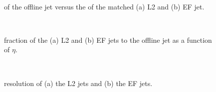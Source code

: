 \begin{figure}
\centering
\mbox{
                              }
\caption[Offline jet \et{} versus L2/EF jet \et{}]{
\et{} of the offline jet versus the \et{} of the matched (a) L2 and (b) EF jet.
\label{SW_jet_L2EF_EtEt}}
\end{figure}


\begin{figure}
\centering
\mbox{
                              }
\caption[\et{} fraction of L2 and EF jet to offline jet ]{
\et{} fraction of the (a) L2 and (b) EF jets to the offline jet \et{} as a function of $\eta$. 
\label{SW_jet_L2EF_EtFrac_Eta}}

\end{figure}

\begin{figure}
\centering
\mbox{
                              }
\caption[\et{} resolution between offline jet \et{} and L2/EF jet \et{}]{
\et{} resolution of (a) the L2 jets and (b) the EF jets. 
\label{SW_jet_L2EF_Reco}}
\end{figure}

